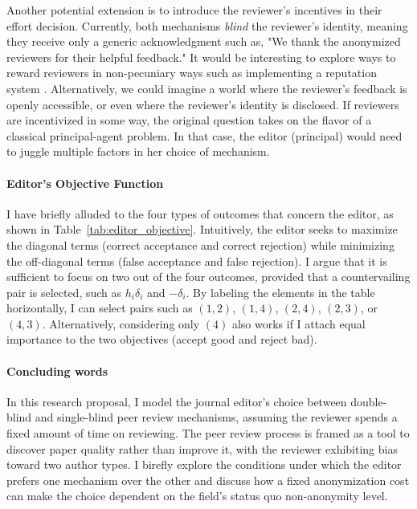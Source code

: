 \documentclass[12pt]{article}
\begin{document}
Another potential extension is to introduce the reviewer's incentives in their
effort decision. Currently, both mechanisms \textit{blind} the reviewer's
identity, meaning they receive only a generic acknowledgment such as, "We thank
the anonymized reviewers for their helpful feedback." It would be interesting
to explore ways to reward reviewers in non-pecuniary ways such as implementing
a reputation system \citep{soergel2013open}. Alternatively, we could imagine a
world where the reviewer's feedback is openly accessible, or even where the
reviewer's identity is disclosed. If reviewers are incentivized in some way,
the original question takes on the flavor of a classical principal-agent
problem. In that case, the editor (principal) would need to juggle multiple
factors in her choice of mechanism.

\paragraph{Editor's Objective Function}
I have briefly alluded to the four types of outcomes that concern the editor,
as shown in Table~\ref{tab:editor_objective}. Intuitively, the editor seeks to
maximize the diagonal terms (correct acceptance and correct rejection) while
minimizing the off-diagonal terms (false acceptance and false rejection). I
argue that it is sufficient to focus on two out of the four outcomes, provided
that a countervailing pair is selected, such as $h_i \delta_i$ and $-\delta_i$.
By labeling the elements in the table horizontally, I can select pairs such as
$(1, 2)$, $(1, 4)$, $(2, 4)$, $(2, 3)$, or $(4, 3)$. Alternatively, considering
only $(4)$ also works if I attach equal importance to the two objectives
(accept good and reject bad).

\paragraph{Concluding words} In this research proposal, I model the journal editor's choice between
double-blind and single-blind peer review mechanisms, assuming the reviewer
spends a fixed amount of time on reviewing. The peer review process is framed
as a tool to discover paper quality rather than improve it, with the reviewer
exhibiting bias toward two author types. I birefly explore the conditions under
which the editor prefers one mechanism over the other and discuss how a fixed
anonymization cost can make the choice dependent on the field's status quo
non-anonymity level.

\pagebreak
\newpage

\end{document}

